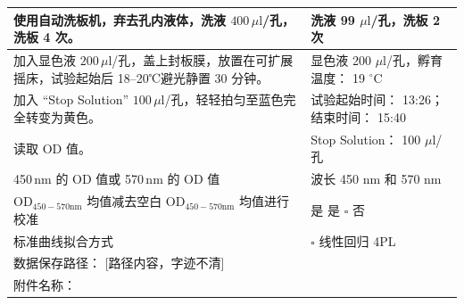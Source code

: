 \documentclass[UTF8,10pt,a4paper,fontset=fandol]{ctexart}
\newcommand{\fieldvalue}[1]{#1}
\newcommand{\handwritten}[1]{#1}
\begin{document}
\begin{tabularx}{\textwidth}{|p{}|X|}
\hline
使用自动洗板机，弃去孔内液体，洗液 $400\,\mu\mathrm{l}$/孔，洗板 4 次。 &
洗液
\fieldvalue{\handwritten{99}} $\mu\mathrm{l}$/孔，洗板
\fieldvalue{\handwritten{2}} 次 \\
\hline
加入显色液 $200\,\mu\mathrm{l}$/孔，盖上封板膜，放置在可扩展摇床，试验起始后 18--20℃避光静置 30 分钟。 &
显色液
\fieldvalue{\handwritten{200}} $\mu\mathrm{l}$/孔，孵育温度：
\fieldvalue{\handwritten{19}} $^\circ\mathrm{C}$ \\
\hline
加入 ``Stop Solution'' $100\,\mu\mathrm{l}$/孔，轻轻拍匀至蓝色完全转变为黄色。 &
试验起始时间：
\fieldvalue{\handwritten{13:26}}；结束时间：
\fieldvalue{\handwritten{15:40}} \\
\hline
读取 OD 值。 &
Stop Solution：
\fieldvalue{\handwritten{100}} $\mu\mathrm{l}$/孔 \\
\hline
450\,nm 的 OD 值或 570\,nm 的 OD 值 &
波长
\fieldvalue{\handwritten{450}} nm 和
\fieldvalue{\handwritten{570}} nm \\
\hline
OD$_{450-570\mathrm{nm}}$ 均值减去空白 OD$_{450-570\mathrm{nm}}$ 均值进行校准 &
是
\fieldvalue{\handwritten{是}} \quad $\square$ 否 \\
\hline
标准曲线拟合方式 &
$\square$ 线性回归 \quad
\fieldvalue{\handwritten{4PL}} \\
\hline
\multicolumn{2}{|l|}{数据保存路径：
\fieldvalue{\handwritten{[路径内容，字迹不清]}}} \\
\hline
\multicolumn{2}{|l|}{附件名称：
}
\end{tabularx}
\end{document}
